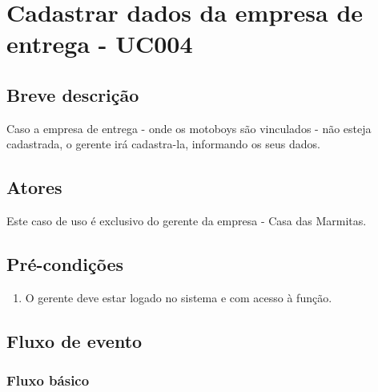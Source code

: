 \chapter{Cadastrar dados da empresa de entrega - UC004} \label{uc004}

\section{Breve descrição}

Caso a empresa de entrega - onde os motoboys são vinculados - não esteja cadastrada, o gerente irá cadastra-la, informando os seus dados.

\section{Atores}

Este caso de uso é exclusivo do gerente da empresa - Casa das Marmitas.

\section{Pré-condições}

\begin{enumerate}
	\item O gerente deve estar logado no sistema e com acesso à função.
\end{enumerate}

\section{Fluxo de evento}

\subsection{Fluxo básico}

